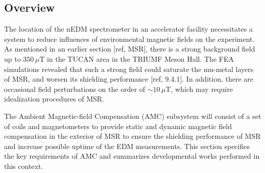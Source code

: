 \subsection{Overview}
The location of the nEDM spectrometer in an accelerator facility necessitates a system to reduce influences of environmental magnetic fields on the experiment. As mentioned in an earlier section [ref, MSR], there is a strong background field up to $350\,\mu$T in the TUCAN area in the TRIUMF Meson Hall. The FEA simulations revealed that such a strong field could saturate the mu-metal layers of MSR, and worsen its shielding performance [ref, 9.4.1]. In addition, there are occasional field perturbations on the order of $\sim 10\,\mu$T, which may require idealization procedures of MSR. 

The Ambient Magnetic-field Compensation (AMC) subsystem will consist of a set of coils and magnetometers to provide static and dynamic magnetic field compensation in the exterior of MSR to ensure the shielding performance of MSR and increase possible uptime of the EDM measurements. This section specifies the key requirements of  AMC and summarizes developmental works performed in this context.  

